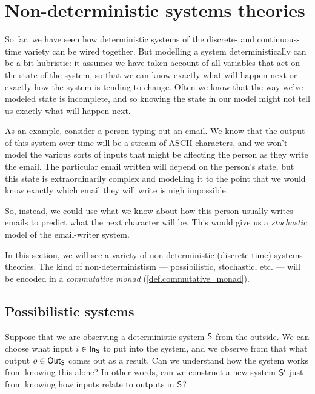 \documentclass[DynamicalBook]{subfiles}
\begin{document}
%


\setcounter{chapter}{1}%


\chapter{Non-deterministic systems theories}\label{chapter.2}

So far, we have seen how deterministic systems of the discrete- and
continuous-time variety can be wired together. But modelling a system
deterministically can be a bit hubristic: it assumes we have taken account of
all variables that act on the state of the system, so that we can know exactly
what will happen next or exactly how the system is tending to change. Often we
know that the way we've modeled state is incomplete, and so knowing the state in
our model might not tell us exactly what will happen next.

As an example, consider a person typing out an email. We know that the output of
this system over time will be a stream of ASCII characters, and we won't model the various sorts
of inputs that might be affecting the person as they write the email. The
particular email written will depend on the person's state, but this state is
extraordinarily complex and modelling it to the point that we would know exactly
which email they will write is nigh impossible. 

So, instead, we could use what
we know about how this person usually writes emails to predict what
the next character will be. This would give us a \emph{stochastic} model of the
email-writer system.

In this section, we will see a variety of non-deterministic (discrete-time)
systems theories. The kind of non-deterministism --- possibilistic, stochastic, etc.
--- will be encoded in a \emph{commutative monad}
(\cref{def.commutative_monad}). 

\section{Possibilistic  systems}

Suppose that we are observing a deterministic system $\mathsf{S}$ from the outside.
We can choose what input $i \in \mathsf{In}_{\mathsf{S}}$ to put into the system, and we observe
from that what output $o \in \mathsf{Out}_{\mathsf{S}}$ comes out as a result. Can we understand
how the system works from knowing this alone? In other words, can we construct a
new system $\mathsf{S'}$ just from knowing how inputs relate to outputs in $\mathsf{S}$?
\end{document}
